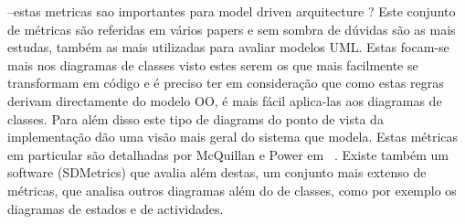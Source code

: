 --estas metricas sao importantes para model driven arquitecture ?
Este conjunto de métricas são referidas em vários papers e sem sombra de dúvidas são as mais estudas, também as mais utilizadas para avaliar modelos UML.
Estas focam-se mais nos diagramas de classes visto estes serem os que mais facilmente se transformam em código e é preciso ter
em consideração que como estas regras derivam directamente do modelo OO, é mais fácil aplica-las
aos diagramas de classes. Para além disso este tipo de diagrams do ponto de vista da implementação dão uma visão mais geral do sistema que modela.
Estas métricas em particular são detalhadas por McQuillan e Power em ~\cite{Power}. Existe também um software (SDMetrics) que avalia além destas, um conjunto mais extenso de métricas, que analisa outros diagramas além do de classes, como por exemplo os diagramas de estados e de actividades.

